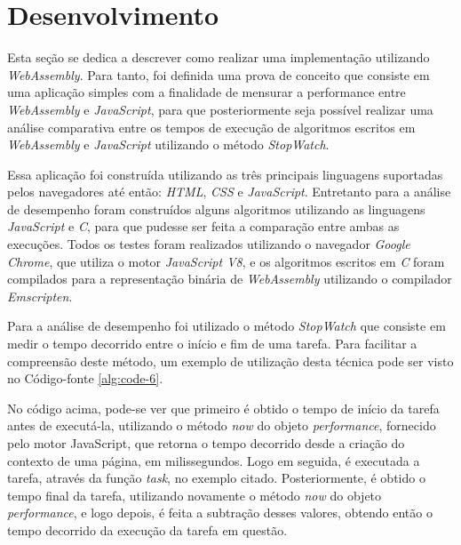 \chapter{Desenvolvimento}
\label{chap:development}

Esta seção se dedica a descrever como realizar uma implementação utilizando
\textit{WebAssembly}. Para tanto, foi definida uma prova de conceito que consiste em uma
aplicação simples com a finalidade de mensurar a performance entre \textit{WebAssembly} e
\textit{JavaScript}, para que posteriormente seja possível realizar uma análise
comparativa entre os tempos de execução de algoritmos escritos em \textit{WebAssembly} e
\textit{JavaScript} utilizando o método \textit{StopWatch}.

Essa aplicação foi construída utilizando as três principais linguagens suportadas pelos
navegadores até então: \textit{HTML}, \textit{CSS} e \textit{JavaScript}. Entretanto para
a análise de desempenho foram construídos alguns algoritmos utilizando as linguagens
\textit{JavaScript} e \textit{C}, para que pudesse ser feita a comparação entre ambas as
execuções. Todos os testes foram realizados utilizando o navegador \textit{Google Chrome},
que utiliza o motor \textit{JavaScript V8}, e os algoritmos escritos em \textit{C} foram
compilados para a representação binária de \textit{WebAssembly} utilizando o compilador
\textit{Emscripten}.

Para a análise de desempenho foi utilizado o método \textit{StopWatch} que consiste em
medir o tempo decorrido entre o início e fim de uma tarefa. Para facilitar a compreensão
deste método, um exemplo de utilização desta técnica pode ser visto no Código-fonte
\ref{alg:code-6}.



No código acima, pode-se ver que primeiro é obtido o tempo de início da tarefa antes de
executá-la, utilizando o método \textit{now} do objeto \textit{performance}, fornecido
pelo motor JavaScript, que retorna o tempo decorrido desde a criação do contexto de
uma página, em milissegundos. Logo em seguida, é executada a tarefa, através da função
\textit{task}, no exemplo citado. Posteriormente, é obtido o tempo final da tarefa,
utilizando novamente o método \textit{now} do objeto \textit{performance}, e logo depois,
é feita a subtração desses valores, obtendo então o tempo decorrido da execução da tarefa
em questão.

